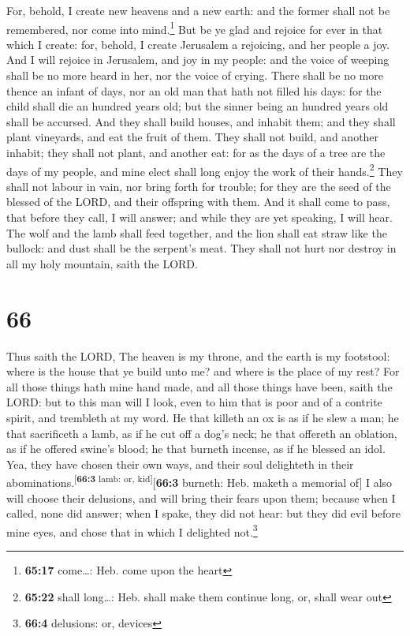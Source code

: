  For, behold, I create new heavens and a new earth: and
the former shall not be remembered, nor come into mind.\footnote{\textbf{65:17}
  come\ldots: Heb. come upon the heart}  But be ye glad
and rejoice for ever in that which I create: for, behold, I create
Jerusalem a rejoicing, and her people a joy.  And I will
rejoice in Jerusalem, and joy in my people: and the voice of weeping
shall be no more heard in her, nor the voice of crying. 
There shall be no more thence an infant of days, nor an old man that
hath not filled his days: for the child shall die an hundred years old;
but the sinner being an hundred years old shall be accursed.
 And they shall build houses, and inhabit them; and they
shall plant vineyards, and eat the fruit of them.  They
shall not build, and another inhabit; they shall not plant, and another
eat: for as the days of a tree are the days of my people, and mine elect
shall long enjoy the work of their hands.\footnote{\textbf{65:22} shall
  long\ldots: Heb. shall make them continue long, or, shall wear out}
 They shall not labour in vain, nor bring forth for
trouble; for they are the seed of the blessed of the LORD, and their
offspring with them.  And it shall come to pass, that
before they call, I will answer; and while they are yet speaking, I will
hear.  The wolf and the lamb shall feed together, and the
lion shall eat straw like the bullock: and dust shall be the serpent's
meat. They shall not hurt nor destroy in all my holy mountain, saith the
LORD.

\hypertarget{section-65}{%
\section{66}\label{section-65}}

 Thus saith the LORD, The heaven is my throne, and the
earth is my footstool: where is the house that ye build unto me? and
where is the place of my rest?  For all those things hath
mine hand made, and all those things have been, saith the LORD: but to
this man will I look, even to him that is poor and of a contrite spirit,
and trembleth at my word.  He that killeth an ox is as if
he slew a man; he that sacrificeth a lamb, as if he cut off a dog's
neck; he that offereth an oblation, as if he offered swine's blood; he
that burneth incense, as if he blessed an idol. Yea, they have chosen
their own ways, and their soul delighteth in their
abominations.\textsuperscript{{[}\textbf{66:3} lamb: or,
kid{]}}{[}\textbf{66:3} burneth: Heb. maketh a memorial of{]}
 I also will choose their delusions, and will bring their
fears upon them; because when I called, none did answer; when I spake,
they did not hear: but they did evil before mine eyes, and chose that in
which I delighted not.\footnote{\textbf{66:4} delusions: or, devices}

